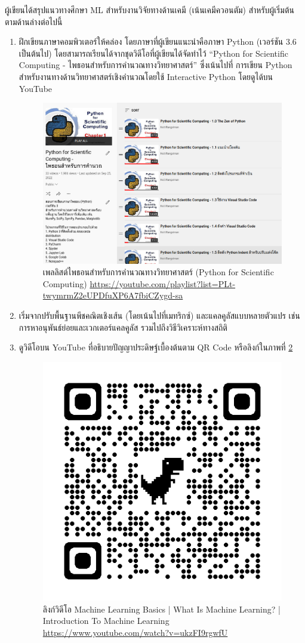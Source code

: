 ผู้เขียนได้สรุปแนวทางศึกษา ML สำหรับงานวิจัยทางด้านเคมี (เน้นเคมีควอนตัม) สำหรับผู้เริ่มต้นตามด้านล่างต่อไปนี้
%
\begin{enumerate}[topsep=0pt,noitemsep]\setlength\itemsep{0.5em}
    \item ฝึกเขียนภาษาคอมพิวเตอร์ให้คล่อง โดยภาษาที่ผู้เขียนแนะนำคือภาษา Python (เวอร์ชัน 3.6 เป็นต้นไป) โดยสามารถเรียนได้จากชุดวิดีโอที่ผู้เขียนได้จัดทำไว้ \enquote{Python for Scientific Computing - ไพธอนสำหรับการคำนวณทางวิทยาศาสตร์} ซึ่งเน้นไปที่    การเขียน Python สำหรับงานทางด้านวิทยาศาสตร์เชิงคำนวณโดยใช้ Interactive Python โดยดูได้บน YouTube
    
    \begin{figure}[H]
        \centering
        \includegraphics[width=0.9\linewidth]{fig/youtube_python_sci.png}
        \caption{เพลลิสต์ไพธอนสำหรับการคำนวณทางวิทยาศาสตร์ (Python for Scientific Computing) 
        \url{https://youtube.com/playlist?list=PLt-twymrmZ2eUPDfuXP6A7fbiCZygd-sa}}
        \label{fig:yt_python_sci}
    \end{figure}

    \item เริ่มจากปรับพื้นฐานพีชคณิตเชิงเส้น (โดยเน้นไปที่เมทริกซ์) และแคลคูลัสแบบหลายตัวแปร เช่น การหาอนุพันธ์ย่อยและเวกเตอร์แคลคูลัส รวมไปถึงวิธีวิเคราะห์ทางสถิติ
    
    \item ดูวิดีโอบน YouTube ที่อธิบายปัญญาประดิษฐ์เบื้องต้นตาม QR Code หรือลิงก์ในภาพที่ \ref{fig:qr_code_intro_ml}
    
    \begin{figure}[H]
        \centering
        \includegraphics[width=0.3\linewidth]{fig/qr_code_intro_ml.png}
        \caption{ลิงก์วิดีโอ Machine Learning Basics | What Is Machine Learning? | Introduction To Machine Learning \url{https://www.youtube.com/watch?v=ukzFI9rgwfU}}
        \label{fig:qr_code_intro_ml}
    \end{figure}


\end{enumerate}
